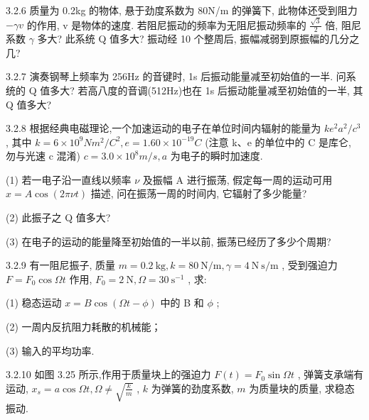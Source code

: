 \begin{problem}{3.2.6}
质量为 0.2kg 的物体, 悬于劲度系数为 80N/m 的弹簧下, 此物体还受到阻力 $-\gamma v$ 的作用, v 是物体的速度. 若阻尼振动的频率为无阻尼振动频率的 $\frac{\sqrt{3}}{2}$ 倍, 阻尼系数 $\gamma$ 多大? 此系统 Q 值多大? 振动经 10 个整周后, 振幅减弱到原振幅的几分之几?
\end{problem}
\clearpage


\begin{problem}{3.2.7}
演奏钢琴上频率为 256Hz 的音键时, 1s 后振动能量减至初始值的一半. 问系统的 Q 值多大? 若高八度的音调(512Hz)也在 1s 后振动能量减至初始值的一半, 其 Q 值多大?
\end{problem}
\clearpage


\begin{problem}{3.2.8}
根据经典电磁理论,一个加速运动的电子在单位时间内辐射的能量为 $ke^{2}a^{2}/c^{3}$ , 其中 $k=6\times10^{9}Nm^{2}/C^{2}, e=1.60\times10^{-19}C$ (注意 k、e 的单位中的 C 是库仑, 勿与光速 c 混淆) $c=3.0\times10^{8}m/s, a$ 为电子的瞬时加速度.

(1) 若一电子沿一直线以频率 $\nu$ 及振幅 A 进行振荡, 假定每一周的运动可用 $x = A \cos(2\pi \nu t)$ 描述, 问在振荡一周的时间内, 它辐射了多少能量?

(2) 此振子之 Q 值多大?

(3) 在电子的运动的能量降至初始值的一半以前, 振荡已经历了多少个周期?
\end{problem}
\clearpage


\begin{problem}{3.2.9}
有一阻尼振子, 质量 $m = 0.2 \mathrm{~kg}, k = 80 \mathrm{~N} / \mathrm{m}, \gamma = 4 \mathrm{~N} \mathrm{~s} / \mathrm{m}$ , 受到强迫力 $F = F_{0} \cos \Omega t$ 作用, $F_{0} = 2 \mathrm{~N}, \Omega = 30 \mathrm{~s}^{-1}$ , 求:

(1) 稳态运动 $x = B \cos(\Omega t - \phi)$ 中的 B 和 $\phi$ ;

(2) 一周内反抗阻力耗散的机械能；

(3) 输入的平均功率.
\end{problem}
\clearpage


\begin{problem}{3.2.10}
如图 3.25 所示,作用于质量块上的强迫力 $F(t) = F_0\sin \Omega t$ , 弹簧支承端有运动, $x_s = a\cos \Omega t, \Omega \neq \sqrt{\frac{k}{m}}$ , $k$ 为弹簧的劲度系数, $m$ 为质量块的质量, 求稳态振动.
\begin{center}

\end{center}
\end{problem}
\clearpage


